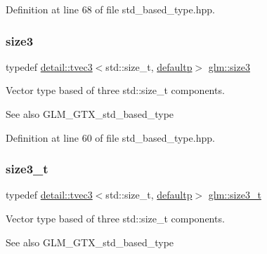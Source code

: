 Definition at line 68 of file std\+\_\+based\+\_\+type.\+hpp.

\mbox{\label{group__gtx__std__based__type_gae1dda4cdccd4c1abeeb2e470c048d0c9}} 
\subsubsection{\texorpdfstring{size3}{size3}}
{\footnotesize\ttfamily typedef \hyperlink{structglm_1_1detail_1_1tvec3}{detail\+::tvec3}$<$std\+::size\+\_\+t, \hyperlink{namespaceglm_a0f04f086094c747d227af4425893f545a9d21ccd8b5a009ec7eb7677befc3bf51}{defaultp}$>$ \hyperlink{group__gtx__std__based__type_gae1dda4cdccd4c1abeeb2e470c048d0c9}{glm\+::size3}}

Vector type based of three std\+::size\+\_\+t components. \begin{DoxySeeAlso}{See also}
G\+L\+M\+\_\+\+G\+T\+X\+\_\+std\+\_\+based\+\_\+type 
\end{DoxySeeAlso}


Definition at line 60 of file std\+\_\+based\+\_\+type.\+hpp.

\mbox{\label{group__gtx__std__based__type_gad9ddaab6dd4c37ba46b74a1423ef2ba3}} 
\subsubsection{\texorpdfstring{size3\+\_\+t}{size3\_t}}
{\footnotesize\ttfamily typedef \hyperlink{structglm_1_1detail_1_1tvec3}{detail\+::tvec3}$<$std\+::size\+\_\+t, \hyperlink{namespaceglm_a0f04f086094c747d227af4425893f545a9d21ccd8b5a009ec7eb7677befc3bf51}{defaultp}$>$ \hyperlink{group__gtx__std__based__type_gad9ddaab6dd4c37ba46b74a1423ef2ba3}{glm\+::size3\+\_\+t}}

Vector type based of three std\+::size\+\_\+t components. \begin{DoxySeeAlso}{See also}
G\+L\+M\+\_\+\+G\+T\+X\+\_\+std\+\_\+based\+\_\+type 
\end{DoxySeeAlso}



